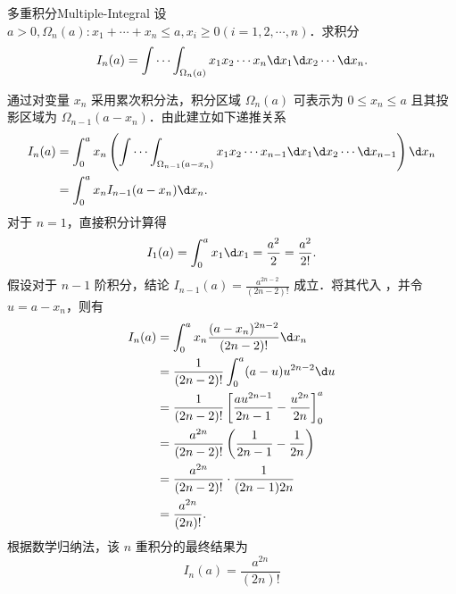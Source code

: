 \begin{problem}{多重积分}{Multiple-Integral}
    设 $a > 0, \Omega_n(a) : x_1 + \cdots + x_n \leqslant a, x_i \geqslant 0 (i = 1, 2, \cdots , n)$．求积分
    \begin{equation}
        I_n(a) = \int \cdots \int_{\Omega_n(a)} x_1 x_2 \cdots x_n \d x_1 \d x_2 \cdots \d x_n.
    \end{equation}
\end{problem}

\begin{solution}
    通过对变量 $x_n$ 采用累次积分法，积分区域 $\Omega_n(a)$ 可表示为 $0 \leqslant x_n \leqslant a$ 且其投影区域为 $\Omega_{n-1}(a - x_n)$．由此建立如下递推关系
    \begin{equation}
        \begin{aligned}
            I_n(a) & = \int_0^a x_n \left( \int \cdots \int_{\Omega_{n-1}(a - x_n)} x_1 x_2 \cdots x_{n-1} \d x_1 \d x_2 \cdots \d x_{n-1} \right) \d x_n \\
                   & = \int_0^a x_n I_{n-1}(a - x_n) \d x_n.
        \end{aligned}
        \label{eq:recurrence}
    \end{equation}
    对于 $n=1$，直接积分计算得
    \begin{equation}
        I_1(a) = \int_0^a x_1 \d x_1 = \frac{a^2}{2} = \frac{a^2}{2!}.
    \end{equation}
    假设对于 $n-1$ 阶积分，结论 $I_{n-1}(a) = \frac{a^{2n-2}}{(2n-2)!}$ 成立．将其代入 ，并令 $u = a - x_n$，则有
    \begin{equation}
        \begin{aligned}
            I_n(a) & = \int_0^a x_n \frac{(a - x_n)^{2n-2}}{(2n-2)!} \d x_n                             \\
                   & = \frac{1}{(2n-2)!} \int_0^a (a - u) u^{2n-2} \d u                                 \\
                   & = \frac{1}{(2n-2)!} \left[ \frac{a u^{2n-1}}{2n-1} - \frac{u^{2n}}{2n} \right]_0^a \\
                   & = \frac{a^{2n}}{(2n-2)!} \left( \frac{1}{2n-1} - \frac{1}{2n} \right)              \\
                   & = \frac{a^{2n}}{(2n-2)!} \cdot \frac{1}{(2n-1)2n}                                  \\
                   & = \frac{a^{2n}}{(2n)!}.
        \end{aligned}
    \end{equation}
    根据数学归纳法，该 $n$ 重积分的最终结果为
    \begin{equation}
        \boxed{I_n(a) = \frac{a^{2n}}{(2n)!}}
    \end{equation}
\end{solution}


